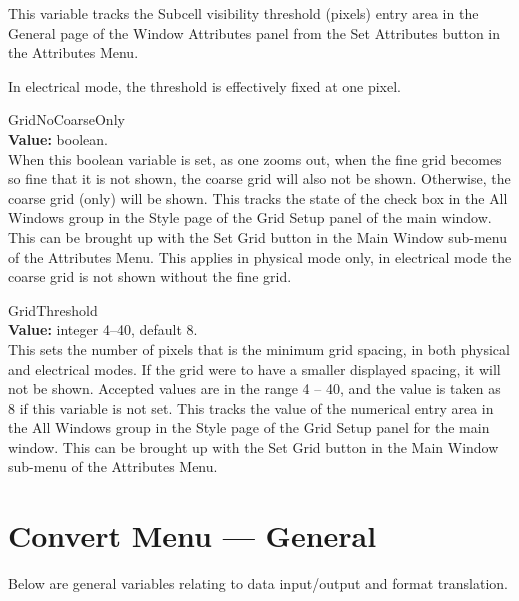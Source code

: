 \begin{description}
This variable tracks the {\cb Subcell visibility threshold (pixels)}
entry area in the {\cb General} page of the {\cb Window Attributes}
panel from the {\cb Set Attributes} button in the {\cb Attributes
Menu}.

In electrical mode, the threshold is effectively fixed at one pixel.

\item{\et GridNoCoarseOnly}\\
{\bf Value:} boolean.\\
When this boolean variable is set, as one zooms out, when the fine
grid becomes so fine that it is not shown, the coarse grid will also
not be shown.  Otherwise, the coarse grid (only) will be shown.  This
tracks the state of the check box in the {\cb All Windows} group in
the {\cb Style} page of the {\cb Grid Setup} panel of the main window. 
This can be brought up with the {\cb Set Grid} button in the {\cb Main
Window} sub-menu of the {\cb Attributes Menu}.  This applies in
physical mode only, in electrical mode the coarse grid is not shown
without the fine grid.

\item{\et GridThreshold}\\
{\bf Value:} integer 4--40, default 8.\\
This sets the number of pixels that is the minimum grid spacing, in
both physical and electrical modes.  If the grid were to have a
smaller displayed spacing, it will not be shown.  Accepted values are
in the range 4 -- 40, and the value is taken as 8 if this variable is
not set.  This tracks the value of the numerical entry area in the
{\cb All Windows} group in the {\cb Style} page of the {\cb Grid
Setup} panel for the main window.  This can be brought up with the
{\cb Set Grid} button in the {\cb Main Window} sub-menu of the {\cb
Attributes Menu}.
\end{description}


\section{Convert Menu --- General}

Below are general variables relating to data input/output and format
translation.

